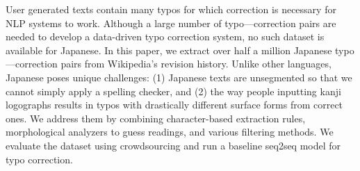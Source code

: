 User generated texts contain many typos for which correction is necessary for NLP systems to work. Although a large number of typo---correction pairs are needed to develop a data-driven typo correction system, no such dataset is available for Japanese. In this paper, we extract over half a million Japanese typo---correction pairs from Wikipedia's revision history. Unlike other languages, Japanese poses unique challenges: (1) Japanese texts are unsegmented so that we cannot simply apply a spelling checker, and (2) the way people inputting kanji logographs results in typos with drastically different surface forms from correct ones. We address them by combining character-based extraction rules, morphological analyzers to guess readings, and various filtering methods. We evaluate the dataset using crowdsourcing and run a baseline seq2seq model for typo correction.
